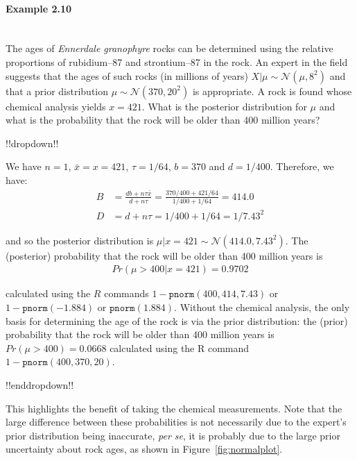 \paragraph{Example 2.10}{~\\
The ages of {\it Ennerdale granophyre} rocks can be determined using \label{ex:rocks} the relative proportions of rubidium--87 and strontium--87 in the rock. An expert in the field suggests that the ages of such rocks (in millions of years) $X|\mu\sim \mathcal{N}(\mu,8^2)$ and that a prior distribution $\mu\sim \mathcal{N}(370,20^2)$ is appropriate. A rock is found whose chemical analysis yields $x=421$. What is the posterior distribution for $\mu$ and what is the probability that the rock will be older than 400 million years?

!!dropdown!!

We have $n=1$, $\bar x=x=421$, $\tau=1/64$, $b=370$ and $d=1/400$. Therefore, we have:
        \begin{align*}
        B&=\frac{db+n\tau\bar x}{d+n\tau}
        =\frac{370/400+421/64}{1/400+1/64}=414.0\\
        D&=d+n\tau=1/400+1/64=1/7.43^2
        \end{align*}
        
        and so the posterior distribution is $\mu|x=421\sim \mathcal{N}(414.0,7.43^2)$. The (posterior) probability that the rock will be older than 400 million years is
        \begin{align*}
        Pr(\mu>400|x=421)=0.9702
        \end{align*}
        
        calculated using the $R$ commands $1-\texttt{pnorm}(400,414,7.43)$ or $1-\texttt{pnorm}(-1.884)$ or $\texttt{pnorm}(1.884)$. Without the chemical analysis, the only basis for determining the age of the rock is via the prior distribution: the (prior) probability that the rock will be older than 400 million years is $Pr(\mu>400)=0.0668$ calculated using the R command $1-\texttt{pnorm}(400,370,20)$.

!!enddropdown!!




This highlights the benefit of taking the chemical measurements. Note that the large difference between these probabilities is not necessarily due to the expert's prior distribution being inaccurate, {\it per se}, it is probably due to the large prior uncertainty about rock ages, as shown in Figure~\ref{fig:normalplot}.
\begin{figure}[ht]


\end{figure}}
